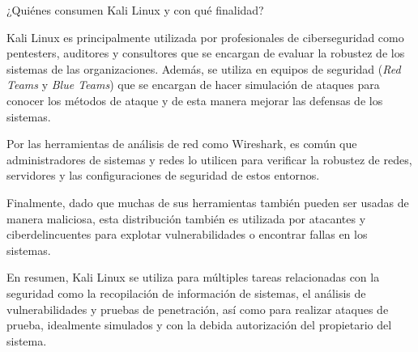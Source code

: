 ¿Quiénes consumen Kali Linux y con qué finalidad?

Kali Linux es principalmente utilizada por profesionales de ciberseguridad como pentesters, auditores y consultores que se encargan de evaluar la robustez de los sistemas de las organizaciones. Además, se utiliza en equipos de seguridad (\textit{Red Teams} y \textit{Blue Teams}) que se encargan de hacer simulación de ataques para conocer los métodos de ataque y de esta manera mejorar las defensas de los sistemas.

Por las herramientas de análisis de red como Wireshark, es común que administradores de sistemas y redes lo utilicen para verificar la robustez de redes, servidores y las configuraciones de seguridad de estos entornos.

Finalmente, dado que muchas de sus herramientas también pueden ser usadas de manera maliciosa, esta distribución también es utilizada por atacantes y ciberdelincuentes para explotar vulnerabilidades o encontrar fallas en los sistemas.

En resumen, Kali Linux se utiliza para múltiples tareas relacionadas con la seguridad como la recopilación de información de sistemas, el análisis de vulnerabilidades y pruebas de penetración, así como para realizar ataques de prueba, idealmente simulados y con la debida autorización del propietario del sistema.
